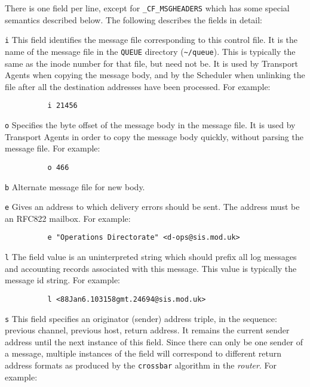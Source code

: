 There is one field per line, except for {\tt \_CF\_MSGHEADERS} which  has
some special semantics described below.  The following describes the fields
in detail:

{\tt i}     
This field identifies the message file corresponding to this control
file.  It is the name of the message file in the {\tt QUEUE}
directory ({\tt \~{}/queue}).  This is typically the same as the
inode number for that file, but need not be.  It is used by Transport
Agents when copying the message body, and by the Scheduler when
unlinking the file after all the destination addresses have been
processed.  For example:

\begin{verbatim}
          i 21456
\end{verbatim}


{\tt o}     
Specifies the byte offset of the message body in the message file.  It
is used by Transport Agents in order to copy the message body quickly,
without parsing the message file.  For example:

\begin{verbatim}
          o 466
\end{verbatim}


{\tt b}     
Alternate message file for new body.

{\tt e}     
Gives an address to which delivery errors should be sent.  The address
must be an RFC822 mailbox.  For example:

\begin{verbatim}
          e "Operations Directorate" <d-ops@sis.mod.uk>
\end{verbatim}


{\tt l}     
The field value is an uninterpreted string which should prefix all log
messages and accounting records associated with this message.  This
value is typically the message id string.  For example:

\begin{verbatim}
          l <88Jan6.103158gmt.24694@sis.mod.uk>
\end{verbatim}


{\tt s}     
This field specifies an originator (sender) address triple, in the
sequence: previous channel, previous host, return address.  It remains
the current sender address until the next instance of this field.
Since there can only be one sender of a message, multiple instances of
the field will correspond to different return address formats as
produced by the {\tt crossbar} algorithm in the {\em router\/}.
For example:

